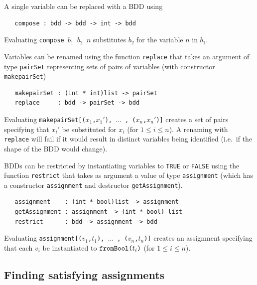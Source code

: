 \documentclass[12pt,fleqn]{article}
\renewcommand{\t}[1]{\mbox{\tt #1}}
\begin{document}
A single variable can be replaced with a BDD using

\begin{verbatim}
   compose : bdd -> bdd -> int -> bdd
\end{verbatim}

Evaluating \t{compose~$b_1$~$b_2$~$n$} substitutes $b_2$ for the
variable $n$ in $b_1$.

Variables can be renamed using the function \t{replace} that takes
an argument of type \t{pairSet} representing sets of pairs of variables
(with constructor \t{makepairSet})

\begin{verbatim}
   makepairSet : (int * int)list -> pairSet
   replace     : bdd -> pairSet -> bdd
\end{verbatim}

Evaluating \t{makepairSet[($x_1$,$x_1'$), $\ldots$ , ($x_n$,$x_n'$)]}
creates a set of pairs specifying that $x_i'$ be substituted for $x_i$
(for $1\leq i\leq n$).  A renaming with \t{replace} will fail if it
would result in distinct variables being identified (i.e.~if the shape of the BDD would change).

BDDs can be restricted by instantiating variables to {\t{TRUE}} or
{\t{FALSE}} using the function \t{restrict} that takes
as argument a value of type \t{assignment}
(which has a constructor \t{assignment} and destructor \t{getAssignment}).

\begin{verbatim}
   assignment    : (int * bool)list -> assignment
   getAssignment : assignment -> (int * bool) list
   restrict      : bdd -> assignment -> bdd
\end{verbatim}

\noindent Evaluating \t{assignment[($v_1$,$t_1$), $\ldots$ , ($v_n$,$t_n$)]}
creates an assignment specifying that each $v_i$ be instantiated to
$\t{fromBool(}t_i\t{)}$ (for $1{\leq}i{\leq}n$). 


\subsection{Finding satisfying assignments}
\end{document}
